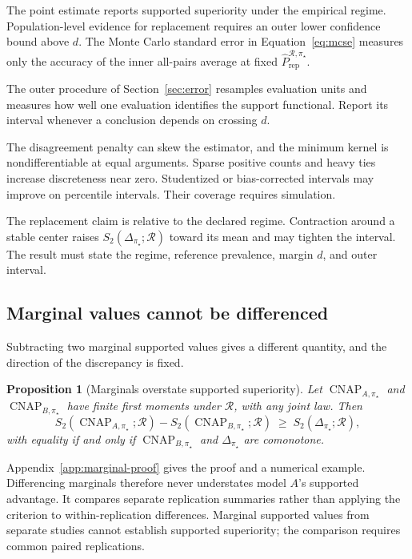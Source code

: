 \documentclass[11pt]{article}
\newcommand{\CNAP}{\operatorname{CNAP}}
\newcommand{\Regime}{\mathcal{R}}
\newcommand{\PRepHat}{\widehat{P}_{\mathrm{rep}}^{\Regime,\pi_\star}}
\newtheorem{proposition}{Proposition}
\theoremstyle{remark}
\begin{document}
The point estimate reports supported superiority under the empirical regime. Population-level evidence for replacement requires an outer lower confidence bound above $d$. The Monte Carlo standard error in Equation~\eqref{eq:mcse} measures only the accuracy of the inner all-pairs average at fixed $\PRepHat$.

The outer procedure of Section~\ref{sec:error} resamples evaluation units and measures how well one evaluation identifies the support functional. Report its interval whenever a conclusion depends on crossing $d$.

The disagreement penalty can skew the estimator, and the minimum kernel is nondifferentiable at equal arguments. Sparse positive counts and heavy ties increase discreteness near zero. Studentized or bias-corrected intervals may improve on percentile intervals. Their coverage requires simulation.

The replacement claim is relative to the declared regime. Contraction around a stable center raises $S_2(\Delta_{\pi_\star};\Regime)$ toward its mean and may tighten the interval. The result must state the regime, reference prevalence, margin $d$, and outer interval.


\subsection{Marginal values cannot be differenced}

Subtracting two marginal supported values gives a different quantity, and the direction of the discrepancy is fixed.

\begin{proposition}[Marginals overstate supported superiority]
Let $\CNAP_{A,\pi_\star}$ and $\CNAP_{B,\pi_\star}$ have finite first moments under $\Regime$, with any joint law. Then
\[
S_2(\CNAP_{A,\pi_\star};\Regime)
-
S_2(\CNAP_{B,\pi_\star};\Regime)
\;\geq\;
S_2(\Delta_{\pi_\star};\Regime),
\]
with equality if and only if $\CNAP_{B,\pi_\star}$ and $\Delta_{\pi_\star}$ are comonotone.
\end{proposition}

Appendix~\ref{app:marginal-proof} gives the proof and a numerical example. Differencing marginals therefore never understates model $A$'s supported advantage. It compares separate replication summaries rather than applying the criterion to within-replication differences. Marginal supported values from separate studies cannot establish supported superiority; the comparison requires common paired replications.
\end{document}
